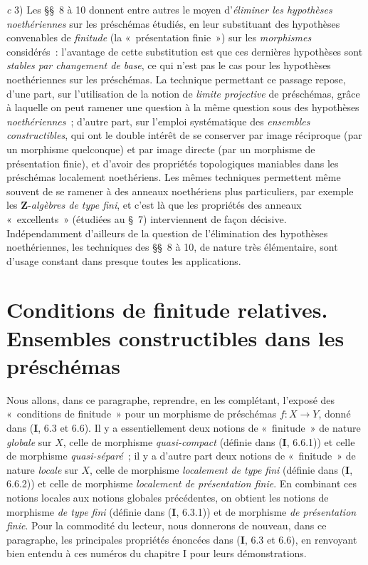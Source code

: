 \medskip
\noindent
\emph{c} 3) Les §§~8 à 10 donnent entre autres le moyen d'\emph{éliminer les
hypothèses noethériennes} sur les préschémas étudiés, en leur substituant des
hypothèses convenables de \emph{finitude} (la «~présentation finie~») sur les
\emph{morphismes} considérés~: l'avantage de cette substitution est que ces
dernières hypothèses sont \emph{stables par changement de base}, ce qui n'est
pas le cas pour les hypothèses noethériennes sur les préschémas. La technique
permettant ce passage repose, d'une part, sur l'utilisation de la notion de
\emph{limite projective} de préschémas, grâce à laquelle on peut ramener une
question à la même question sous des hypothèses \emph{noethériennes}~; d'autre
part, sur l'emploi systématique des \emph{ensembles constructibles}, qui ont
le double intérêt de se conserver par image réciproque (par un morphisme
quelconque) et par image directe (par un morphisme de présentation finie), et
d'avoir des propriétés topologiques maniables dans les préschémas localement
noethériens. Les mêmes techniques permettent même souvent de se ramener à des
anneaux noethériens plus particuliers, par exemple les
$\mathbf Z$-\emph{algèbres de type fini}, et c'est là que les propriétés des
anneaux «~excellents~» (étudiées au §~7) interviennent de façon décisive.
Indépendamment d'ailleurs de la question de l'élimination des hypothèses
noethériennes, les techniques des §§~8 à 10, de nature très élémentaire, sont
d'usage constant dans presque toutes les applications.

\setcounter{section}{0}

\section{Conditions de finitude relatives. Ensembles constructibles dans les préschémas}
\label{section:IV.1-fr}

Nous allons, dans ce paragraphe, reprendre, en les complétant, l'exposé des
«~conditions de finitude~» pour un morphisme de préschémas $f:X\to Y$, donné
dans (\textbf{I}, 6.3 et 6.6). Il y a essentiellement deux notions de «~finitude~» de
nature \emph{globale} sur $X$, celle de morphisme \emph{quasi-compact}
(définie dans (\textbf{I}, 6.6.1)) et celle de morphisme \emph{quasi-séparé}~; il y a
d'autre part deux notions de «~finitude~» de nature \emph{locale} sur $X$,
celle de morphisme \emph{localement de type fini} (définie dans (\textbf{I}, 6.6.2))
et celle de morphisme \emph{localement de présentation finie}. En combinant
ces notions locales aux notions globales précédentes, on obtient les notions
de morphisme \emph{de type fini} (définie dans (\textbf{I}, 6.3.1)) et de morphisme
\emph{de présentation finie}. Pour la commodité du lecteur, nous donnerons de
nouveau, dans ce paragraphe, les principales propriétés énoncées dans (\textbf{I}, 6.3
et 6.6), en renvoyant bien entendu à ces numéros du chapitre I pour leurs
démonstrations.

